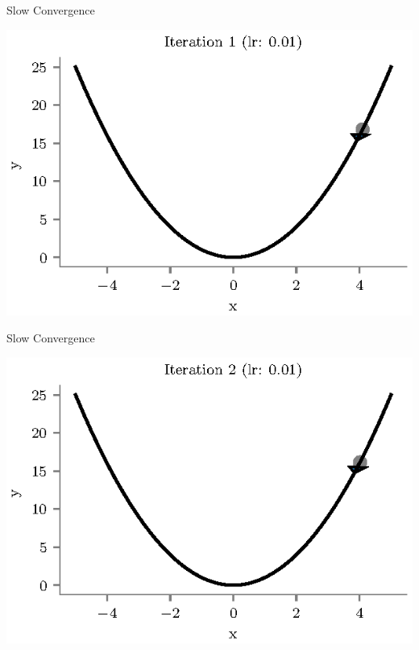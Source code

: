 \documentclass{beamer}
\begin{document}
\begin{frame}{Slow Convergence}
\begin{center}
\includegraphics[totalheight=6cm]{undershooting-1.eps}
\end{center}
\end{frame}

\begin{frame}{Slow Convergence}
\begin{center}
\includegraphics[totalheight=6cm]{undershooting-2.eps}
\end{center}
\end{frame}
\end{document}
